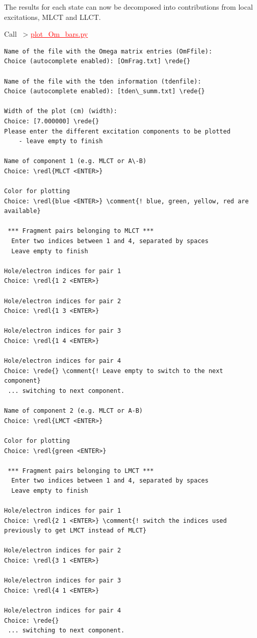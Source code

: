 \documentclass[DIV=12,headings=normal]{scrartcl}
\newcommand{\comment}[1]{\textcolor{blue}{#1}}
\newcommand{\redl}[1]{{\textcolor{red}{\underline{#1}}}}
\newcommand{\rede}[1]{\redl{#1 <ENTER>}}
\newcommand{\comm}[1]{
\small
~> \redl{#1}
\normalsize
}
\begin{document}
The results for each state can now be decomposed into contributions from local excitations, MLCT and LLCT.

Call \comm{plot\_Om\_bars.py}

\scriptsize
\begin{Verbatim}[commandchars=\\\{\}]
Name of the file with the Omega matrix entries (OmFfile):
Choice (autocomplete enabled): [OmFrag.txt] \rede{}

Name of the file with the tden information (tdenfile):
Choice (autocomplete enabled): [tden\_summ.txt] \rede{}

Width of the plot (cm) (width):
Choice: [7.000000] \rede{}
Please enter the different excitation components to be plotted
    - leave empty to finish

Name of component 1 (e.g. MLCT or A\-B)
Choice: \redl{MLCT <ENTER>}

Color for plotting
Choice: \redl{blue <ENTER>} \comment{! blue, green, yellow, red are available}

 *** Fragment pairs belonging to MLCT ***
  Enter two indices between 1 and 4, separated by spaces
  Leave empty to finish

Hole/electron indices for pair 1
Choice: \redl{1 2 <ENTER>}

Hole/electron indices for pair 2
Choice: \redl{1 3 <ENTER>}

Hole/electron indices for pair 3
Choice: \redl{1 4 <ENTER>}

Hole/electron indices for pair 4
Choice: \rede{} \comment{! Leave empty to switch to the next component}
 ... switching to next component.
 
Name of component 2 (e.g. MLCT or A-B)
Choice: \redl{LMCT <ENTER>}  

Color for plotting
Choice: \redl{green <ENTER>}

 *** Fragment pairs belonging to LMCT ***
  Enter two indices between 1 and 4, separated by spaces
  Leave empty to finish

Hole/electron indices for pair 1
Choice: \redl{2 1 <ENTER>} \comment{! switch the indices used previously to get LMCT instead of MLCT}

Hole/electron indices for pair 2
Choice: \redl{3 1 <ENTER>}

Hole/electron indices for pair 3
Choice: \redl{4 1 <ENTER>}

Hole/electron indices for pair 4
Choice: \rede{}
 ... switching to next component.


\end{Verbatim}
\end{document}
